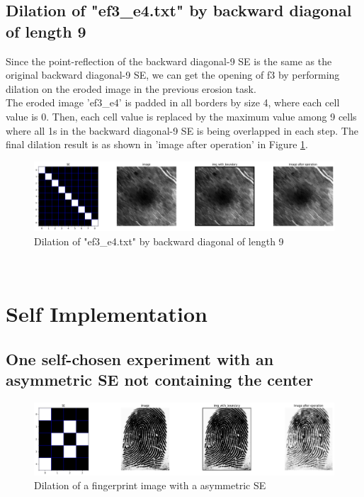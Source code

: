 \documentclass{article}
\begin{document}
\subsection{Dilation of "ef3\_e4.txt" by backward diagonal of length 9}
Since the point-reflection of the backward diagonal-9 SE is the same as the original backward diagonal-9 SE, we can get the opening of f3 by performing dilation on the eroded image in the previous erosion task. \\
The eroded image 'ef3\_e4' is padded in all borders by size 4, where each cell value is 0. Then, each cell value is replaced by the maximum value among 9 cells where all 1s in the backward diagonal-9 SE is being overlapped in each step. The final dilation result is as shown in 'image after operation' in Figure \ref{fig:of3_o4}.\\
\begin{figure}[h!]
\includegraphics[width=\linewidth]{images/of3_o4.png}
\caption{Dilation of "ef3\_e4.txt" by backward diagonal of length 9}
\label{fig:of3_o4}
\end{figure}
\\ 
\newpage
\section{Self Implementation}
\subsection{One self-chosen experiment with an asymmetric SE not containing the center}
\begin{figure}[h!]
\includegraphics[width=\linewidth]{images/fingerprint-output.png}
\caption{Dilation of a fingerprint image with a asymmetric SE}
\label{fig:fingerprint}
\end{figure}
\\
\end{document}
